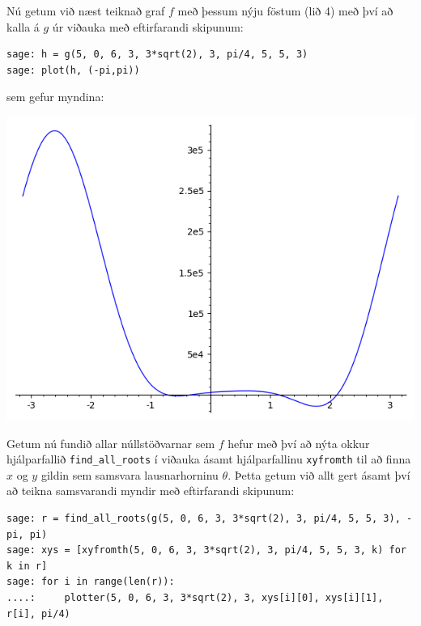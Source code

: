 \documentclass{article}
\begin{document}
\vspace*{0.5cm}

Nú getum við næst teiknað graf $f$ með þessum nýju föstum (lið 4) með því að kalla á $g$ úr viðauka með eftirfarandi skipunum: \\

\begin{verbatim}
sage: h = g(5, 0, 6, 3, 3*sqrt(2), 3, pi/4, 5, 5, 3)
sage: plot(h, (-pi,pi))
\end{verbatim}

\vspace*{0.5cm}

sem gefur myndina: \\

\begin{center}
\includegraphics[scale=0.75]{lidur4aplot}
\end{center}

\vspace*{0.5cm}

Getum nú fundið allar núllstöðvarnar sem $f$ hefur með því að nýta okkur hjálparfallið \verb|find_all_roots| í viðauka ásamt hjálparfallinu \verb|xyfromth| til að finna $x$ og $y$ gildin sem samsvara lausnarhorninu $\theta$. Þetta getum við allt gert ásamt því að teikna samsvarandi myndir með eftirfarandi skipunum: \\

\begin{footnotesize}
\begin{verbatim}
sage: r = find_all_roots(g(5, 0, 6, 3, 3*sqrt(2), 3, pi/4, 5, 5, 3), -pi, pi)
sage: xys = [xyfromth(5, 0, 6, 3, 3*sqrt(2), 3, pi/4, 5, 5, 3, k) for k in r]
sage: for i in range(len(r)):
....:     plotter(5, 0, 6, 3, 3*sqrt(2), 3, xys[i][0], xys[i][1], r[i], pi/4)
\end{verbatim}
\end{footnotesize}
\end{document}
